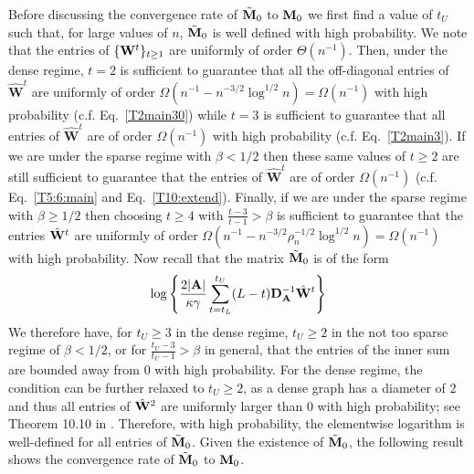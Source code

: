 \documentclass[10pt,journal,compsoc]{IEEEtran}
\newcommand{\bds}{\boldsymbol}
\newcommand{\M}[1]{{{\mathbf{\MakeUppercase{#1}}}}}
\newcommand{\F}{\mathrm{F}}
\numberwithin{equation}{section}
\begin{document}
Before discussing the convergence rate of   $\tilde{\M M}_0$ to ${\M
M}_0$ we first find a value of $t_U$ such that, for large values of $n$, $\tilde{\M M}_0$ is well defined with high
probability. 
We note that the entries of $\{\M W^t\}_{t\geq 1}$ are
uniformly of order $\Theta(n^{-1})$. Then, under the dense regime, $t = 2$ is sufficient to guarantee that all the off-diagonal entries of $\hat{\mathbf{W}}^{t}$ are uniformly of order 
$\Omega(n^{-1} - n^{-3/2} \log^{1/2}{n}) = \Omega(n^{-1})$ with high probability (c.f. Eq.~\eqref{T2main30}) while $t = 3$ is sufficient to guarantee that all entries of $\hat{\mathbf{W}}^{t}$ are of order $\Omega(n^{-1})$ with high probability (c.f. Eq.~\eqref{T2main3}). If we are under the sparse regime with $\beta < 1/2$ then these same values of $t \geq 2$ are still sufficient to guarantee that the entries of $\hat{\mathbf{W}}^{t}$ are of order $\Omega(n^{-1})$ (c.f. Eq.~\eqref{T5:6:main} and Eq.~\eqref{T10:extend}). Finally, if we are under the sparse regime with $\beta \geq 1/2$ then choosing $t \geq 4$ with $\tfrac{t-3}{t-1} > \beta$ is sufficient to guarantee that the entries $\hat{\M
  W}^{t}$ are uniformly of order $\Omega(n^{-1} - n^{-3/2}
\rho_n^{-1/2} \log^{1/2}{n}) = \Omega(n^{-1})$ with high probability. Now recall that the
matrix $\tilde{\M M}_0$ is of the form
$$\log\Bigg\{\frac{2|\M A|}{\kappa \gamma} \sum_{t = t_L}^{t_U}(L - t)\M D_{\M A}^{-1}\hat{\M W}^t\Bigg\}$$
We therefore have, for $t_U \geq 3$ in the dense regime, $t_U \geq 2$ in the not too sparse regime of $\beta < 1/2$, or for $\tfrac{t_U - 3}{t_U - 1} > \beta$ in general,  that the entries of
the inner sum are bounded away from $0$ with high
probability. For the dense regime, the condition can be further relaxed to $t_U \geq 2$, as a dense graph has a diameter of $2$ and thus all entries of $\hat{\M W}^2$ are uniformly larger than $0$ with high probability; see Theorem 10.10 in \cite{bollobas2001random}.  Therefore, with high probability, the elementwise logarithm is well-defined for all
entries of $\tilde{\M M}_0$. 
Given the existence of $\tilde{\M M}_0$, the following result shows the convergence rate of $\tilde{\M
M}_0$ to ${\M M}_0$.
\end{document}
